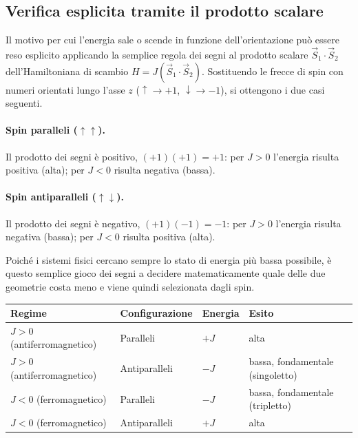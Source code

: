\documentclass[11pt,a4paper]{article}
\begin{document}
\subsection{Verifica esplicita tramite il prodotto scalare}

Il motivo per cui l'energia sale o scende in funzione dell'orientazione pu\`o essere
reso esplicito applicando la semplice regola dei segni al prodotto scalare $\vec
S_1\cdot\vec S_2$ dell'Hamiltoniana di scambio $H=J(\vec S_1\cdot\vec S_2)$.
Sostituendo le frecce di spin con numeri orientati lungo l'asse $z$
($\uparrow\to+1$, $\downarrow\to-1$), si ottengono i due casi seguenti.

\paragraph{Spin paralleli ($\uparrow\uparrow$).} Il prodotto dei segni \`e positivo,
$(+1)(+1)=+1$: per $J>0$ l'energia risulta positiva (alta); per $J<0$ risulta negativa
(bassa).

\paragraph{Spin antiparalleli ($\uparrow\downarrow$).} Il prodotto dei segni \`e
negativo, $(+1)(-1)=-1$: per $J>0$ l'energia risulta negativa (bassa); per $J<0$
risulta positiva (alta).

Poich\'e i sistemi fisici cercano sempre lo stato di energia pi\`u bassa possibile,
\`e questo semplice gioco dei segni a decidere matematicamente quale delle due
geometrie costa meno e viene quindi selezionata dagli spin.

\begin{center}
\begin{tabular}{@{}p{4.8cm}p{2.8cm}p{1.6cm}p{4cm}@{}}
\toprule
Regime & Configurazione & Energia & Esito \\
\midrule
$J>0$ (antiferromagnetico) & Paralleli & $+J$ & alta \\
$J>0$ (antiferromagnetico) & Antiparalleli & $-J$ & bassa, fondamentale (singoletto) \\
$J<0$ (ferromagnetico) & Paralleli & $-J$ & bassa, fondamentale (tripletto) \\
$J<0$ (ferromagnetico) & Antiparalleli & $+J$ & alta \\
\bottomrule
\end{tabular}
\end{center}
\end{document}
